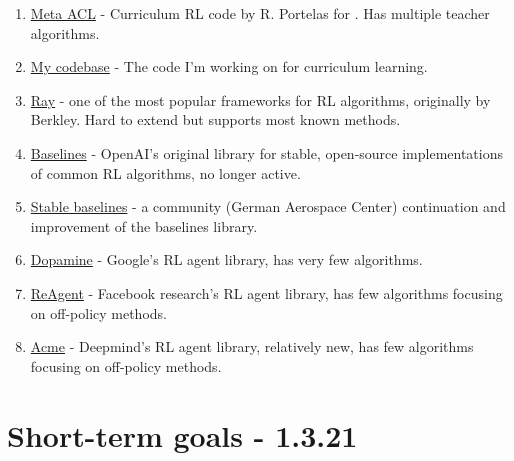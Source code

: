 \documentclass[letterpaper]{article}
\theoremstyle{definition}
\begin{document}
\begin{enumerate}
	
	\item 
	\href{https://github.com/flowersteam/meta-acl}{Meta ACL} - Curriculum RL code by R. Portelas for \cite{Portelas2020a}. Has multiple teacher algorithms.
	
	\item 
	\href{https://github.com/lioritan/phd-work}{My codebase} - The code I'm working on for curriculum learning.
	
	\item 
	\href{https://github.com/ray-project/ray}{Ray} - one of the most popular frameworks for RL algorithms, originally by Berkley. Hard to extend but supports most known methods.
	
	\item \href{https://github.com/openai/baselines}{Baselines} - OpenAI's original library for stable, open-source implementations of common RL algorithms, no longer active.
	
	\item 
	\href{https://github.com/DLR-RM/stable-baselines3}{Stable baselines} - a community (German Aerospace Center) continuation and improvement of the baselines library.
	
	\item 
	\href{https://github.com/google/dopamine}{Dopamine} - Google's RL agent library, has very few algorithms.
	
	\item 
	\href{https://github.com/facebookresearch/ReAgent}{ReAgent} - Facebook research's RL agent library, has few algorithms focusing on off-policy methods.
	
	\item 
	\href{https://github.com/deepmind/acme}{Acme} - Deepmind's RL agent library, relatively new, has few algorithms focusing on off-policy methods. 
	
\end{enumerate}

\section{Short-term goals - 1.3.21} \label{sec:short-term}
\end{document}

